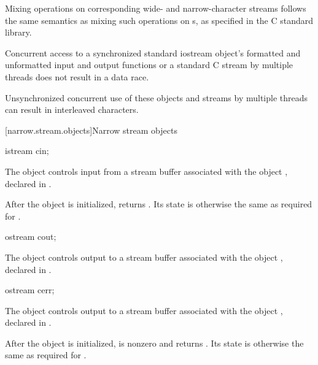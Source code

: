 \pnum
Mixing operations on corresponding wide- and narrow-character streams
follows the same semantics as mixing such operations on
s,
as specified in the C standard library.

\pnum
Concurrent access to a synchronized standard iostream object's formatted and unformatted input and output functions or a standard C stream by multiple threads does not result in a data race.
\begin{note}
Unsynchronized concurrent use of these objects and streams by multiple threads
can result in interleaved characters.
\end{note}


[narrow.stream.objects]{Narrow stream objects}

%
\begin{itemdecl}
istream cin;
\end{itemdecl}

\begin{itemdescr}
\pnum
The object 
controls input from a stream buffer associated with the object ,
declared in .

\pnum
After the object
is initialized,
returns
.
Its state is otherwise the same as required for
.
\end{itemdescr}

%
\begin{itemdecl}
ostream cout;
\end{itemdecl}

\begin{itemdescr}
\pnum
The object 
controls output to a stream buffer associated with the object ,
declared in .
\end{itemdescr}

%
\begin{itemdecl}
ostream cerr;
\end{itemdecl}

\begin{itemdescr}
\pnum
The object 
controls output to a stream buffer associated with the object ,
declared in .

\pnum
After the object
is initialized,
is nonzero and  returns .
Its state is otherwise the same as required for
.
\end{itemdescr}

